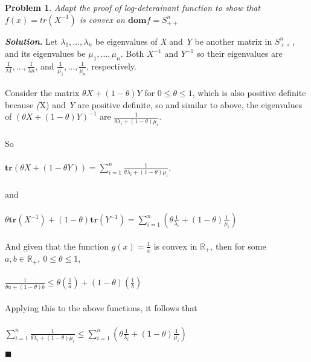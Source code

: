 \documentclass[12pt]{article}
\newtheorem{problem}{Problem}
\newenvironment{solution}[1][\textit{Solution}]{\textbf{#1. }}{$\blacksquare$}
\begin{document}
  \begin{problem}
    Adapt the proof of log-deterainant function to show that $f(x) = tr(X^{-1})$ is convex on $\textbf{dom}f = S^{n}_{++}$
    \end{problem}
  \begin{solution}
    Let $\lambda_{1}, ..., \lambda_{n}$ be eigenvalues of \textit{X} and \textit{Y} be another matrix in $S^{n}_{++}$, and its eigenvalues be $\mu_{1}, ..., \mu_{n}$.
    Both $X^{-1}$ and $Y^{-1}$ so their eigenvalues are $ \frac{1}{\lambda{1}}, ..., \frac{1}{\lambda{n}}$, and $\frac{1}{\mu_{1}}, ..., \frac{1}{\mu_{n}}$, respectively.
    \\ 
    \\ 
    Consider the matrix $\theta X + (1 - \theta)Y$ for $0 \leq \theta \leq 1$, which is also positive definite because \textit(X) and \textit{Y} are positive definite, so and similar to above, the eigenvalues of $(\theta X + (1 - \theta) Y)^{-1}$ are $\frac{1}{\theta \lambda_{i} + (1 - \theta)\mu_{i}}$.
    \\ 
    \\
    So \\ 
    \\
    $\textbf{tr}(\theta X + (1 - \theta Y)) = \sum_{i=1}^{n} \frac{1}{\theta \lambda_{i} + (1 - \theta)\mu_{i}}$,
    \\
    \\ 
    and
    \\ 
    \\
    $\theta \mathbf{tr}({X^{-1}}) + (1 - \theta)\mathbf{tr}({Y^{-1}}) = \sum_{i=1}^{n} (\theta \frac{1}{\lambda_{i}} + (1 - \theta) \frac{1}{\mu_{i}})$
    \\
    \\
    And given that the function $g(x) = \frac{1}{x}$ is convex in $\mathbb{R}_{+}$, then for some $a, b \in \mathbb{R}_{+},\  0 \leq \theta \leq 1$,
    \\ 
    \\ 
    $\frac{1}{\theta a + (1 - \theta)b} \leq \theta (\frac{1}{a}) + (1 - \theta) (\frac{1}{b})$
    \\ 
    \\ 
    Applying this to the above functions, it follows that
    \\ 
    \\ 
    $\sum_{i=1}^{n} \frac{1}{\theta \lambda_{i} + (1 - \theta)\mu_{i}} \leq \sum_{i=1}^{n} (\theta \frac{1}{\lambda_{i}} + (1 - \theta) \frac{1}{\mu_{i}})$

  \end{solution}
\end{document}
